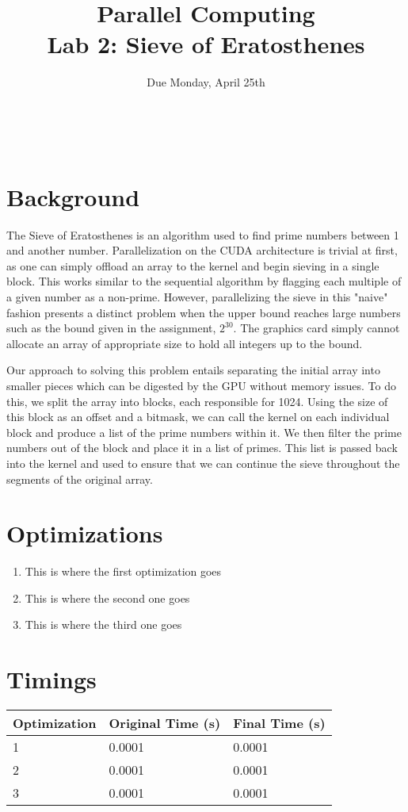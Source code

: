 \documentclass[12pt]{article}
\title{ Parallel Computing \\ Lab 2: Sieve of Eratosthenes }
\author{\MyFullName}
\date{ Due Monday, April 25th }
\begin{document}
\maketitle
\thispagestyle{empty}
\begin{center}
\end{center}
\setcounter{page}{0}
\newpage

\def\thesection{\Roman{section}.}
\hfill \\
\section{ Background }
	The Sieve of Eratosthenes is an algorithm used to find prime numbers between 1 and another number.  Parallelization on the CUDA architecture is trivial at first, as one can simply offload an array to the kernel and begin sieving in a single block.  This works similar to the sequential algorithm by flagging each multiple of a given number as a non-prime.  However, parallelizing the sieve in this "naive" fashion presents a distinct problem when the upper bound reaches large numbers such as the bound given in the assignment, $2^{30}$.  The graphics card simply cannot allocate an array of appropriate size to hold all integers up to the bound.

Our approach to solving this problem entails separating the initial array into smaller pieces which can be digested by the GPU without memory issues.  To do this, we split the array into blocks, each responsible for 1024.  Using the size of this block as an offset and a bitmask, we can call the kernel on each individual block and produce a list of the prime numbers within it.  We then filter the prime numbers out of the block and place it in a list of primes.  This list is passed back into the kernel and used to ensure that we can continue the sieve throughout the segments of the original array.

\section{ Optimizations }
\begin{enumerate}[1.]

\item This is where the first optimization goes

\item This is where the second one goes

\item This is where the third one goes
\end{enumerate}

\section { Timings}


\begin{center}
    \begin{tabular}{ | l | l | l |}
	\hline
   	Optimization & Original Time (s) & Final Time (s) \\ \hline
    	1 & 0.0001 & 0.0001 \\ \hline
	2 & 0.0001 & 0.0001 \\ \hline
	3 & 0.0001 & 0.0001 \\  \hline
    \end{tabular}
\end{center}
\end{document}

